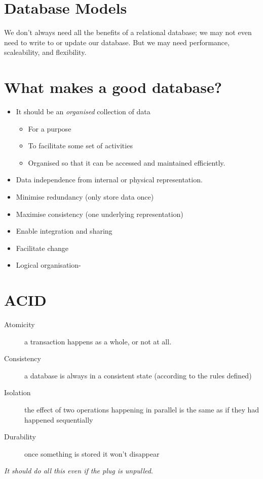 \section{Database Models}
We don't always need all the benefits of a relational database; we may not even need to write to or update our database. But we may need performance, scaleability, and flexibility.

\section{What makes a good database?}
\begin{itemize}
	\item It should be an \textit{organised} collection of data
	\begin{itemize}
		\item For a purpose
		\item To facilitate some set of activities
		\item Organised so that it can be accessed and maintained efficiently.
	\end{itemize}
	\item Data independence from internal or physical representation.
	\item Minimise redundancy (only store data once)
	\item Maximise consistency (one underlying representation)
	\item Enable integration and sharing
	\item Facilitate change
	\item Logical organisation-
\end{itemize}

\section{ACID}
\begin{description}
	\item[Atomicity] a transaction happens as a whole, or not at all.
	\item[Consistency] a database is always in a consistent state (according to the rules defined)
	\item[Isolation] the effect of two operations happening in parallel is the same as if they had happened sequentially
	\item[Durability] once something is stored it won't disappear
\end{description}

\textit{It should do all this even if the plug is unpulled}.

